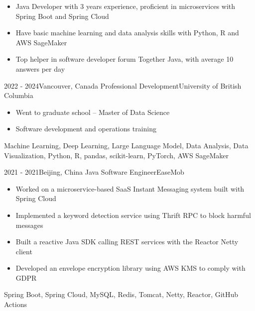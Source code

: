 \documentclass[localFont,alternative]{resume_template}
\begin{document}
	\makecvheader
	   
    \begin{itemize}
        \item Java Developer with 3 years experience, proficient in microservices with Spring Boot and Spring Cloud
        \item Have basic machine learning and data analysis skills with Python, R and AWS SageMaker
        \item Top helper in software developer forum Together Java, with average 10 answers per day
    \end{itemize}

    \vspace{5pt}

    \begin{experiences}
    
    \experience
    {2022 - 2024}{Vancouver, Canada}
    {Professional Development}{University of British Columbia}
    {
        \begin{itemize}
        \item Went to graduate school -- Master of Data Science
        \item Software development and operations training
        \end{itemize}
    }
    {Machine Learning, Deep Learning, Large Language Model, Data Analysis, Data Visualization, Python, R, pandas, scikit-learn, PyTorch, AWS SageMaker}
    
    \emptySeparator
    
    \experience
    {2021 - 2021}{Beijing, China}
    {Java Software Engineer}{EaseMob}
    {
        \begin{itemize}
        \item Worked on a microservice-based SaaS Instant Messaging system built with Spring Cloud
        \item Implemented a keyword detection service using Thrift RPC to block harmful messages
        \item Built a reactive Java SDK calling REST services with the Reactor Netty client
        \item Developed an envelope encryption library using AWS KMS to comply with GDPR
        \end{itemize}
    }
    {Spring Boot, Spring Cloud, MySQL, Redis, Tomcat, Netty, Reactor, GitHub Actions}
    
    \emptySeparator
    

\end{experiences}
\end{document}
